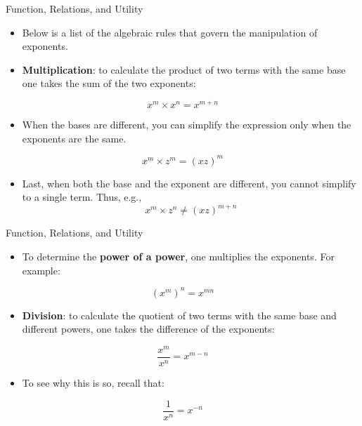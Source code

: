 \documentclass[
  ignorenonframetext,
]{beamer}
\providecommand{\tightlist}{%
  \setlength{\itemsep}{0pt}\setlength{\parskip}{0pt}}
\begin{document}
\begin{frame}{Function, Relations, and Utility}
\protect\hypertarget{function-relations-and-utility-13}{}

\begin{itemize}
\item
  Below is a list of the algebraic rules that govern the manipulation of
  exponents.
\item
  \textbf{Multiplication}: to calculate the product of two terms with
  the same base one takes the sum of the two exponents:
\end{itemize}

\[x^{m} × x^{n} = x^{m+n}\]

\begin{itemize}
\tightlist
\item
  When the bases are different, you can simplify the expression only
  when the exponents are the same.
\end{itemize}

\[x^{m} × z^{m} = (xz)^{m}\]

\begin{itemize}
\tightlist
\item
  Last, when both the base and the exponent are different, you cannot
  simplify to a single term. Thus, e.g.,
  \[x^{m} × z^{n} \neq (xz)^{m+n}\]
\end{itemize}

\end{frame}

\begin{frame}{Function, Relations, and Utility}
\protect\hypertarget{function-relations-and-utility-14}{}

\begin{itemize}
\tightlist
\item
  To determine the \textbf{power of a power}, one multiplies the
  exponents. For example:
\end{itemize}

\[(x^{m})^{n} = x^{mn}\]

\begin{itemize}
\tightlist
\item
  \textbf{Division}: to calculate the quotient of two terms with the
  same base and different powers, one takes the difference of the
  exponents:
\end{itemize}

\[\frac{x^{m}}{x^n}= x^{m-n}\]

\begin{itemize}
\tightlist
\item
  To see why this is so, recall that:
\end{itemize}

\[\frac{1}{x^n}= x^{-n}\]

\end{frame}
\end{document}
